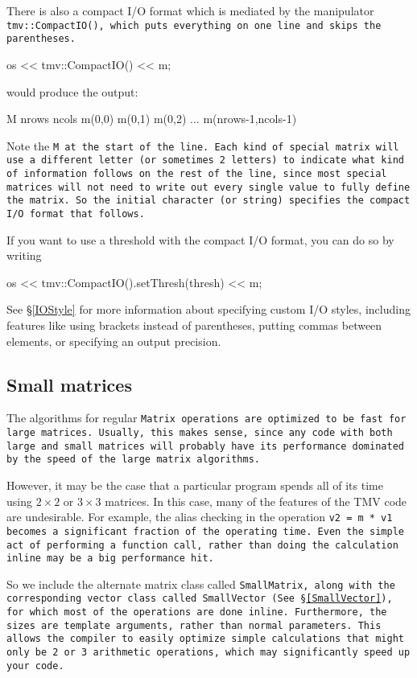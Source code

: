 There is also a compact I/O format which is mediated by the manipulator
\tt{tmv::CompactIO()}, which puts everything on one line and skips the parentheses.
\begin{tmvcode}
os << tmv::CompactIO() << m;
\end{tmvcode}
would produce the output:
\begin{tmvcode}
M nrows ncols m(0,0) m(0,1) m(0,2) ... m(nrows-1,ncols-1)
\end{tmvcode}
Note the \tt{M} at the start of the line.  Each kind of special matrix will use a different letter (or sometimes 2 letters) to indicate what kind of information follows on the rest of the line, since most special matrices will not need to write out every single value to fully define the matrix.  So the initial character (or string) specifies the compact I/O format that follows.

If you want to use a threshold with the compact I/O format, you can do so by writing
\begin{tmvcode}
os << tmv::CompactIO().setThresh(thresh) << m;
\end{tmvcode}
See \S\ref{IOStyle} for more information about specifying custom I/O styles, including
features like using brackets instead of parentheses, putting commas between elements,
or specifying an output precision.  

\subsection{Small matrices}
\label{SmallMatrix}

The algorithms for regular \tt{Matrix} operations are optimized to be
fast for large matrices.  Usually, this makes sense, since any code with
both large and small matrices will probably have its performance dominated
by the speed of the large matrix algorithms.

However, it may be the case that a particular program spends all of its
time using $2 \times 2$ or $3 \times 3$ matrices.  In this case, 
many of the features of the TMV code are undesirable.  For example, 
the alias checking in the operation \tt{v2 = m * v1} becomes a significant
fraction of the operating time.  Even the simple act of performing a function
call, rather than doing the calculation inline may be a big performance hit.

So we include the alternate matrix class called \tt{SmallMatrix}, along 
with the corresponding vector class called \tt{SmallVector} (See \S\ref{SmallVector}), 
for which most of 
the operations are done inline.  Furthermore, the sizes are template arguments,
rather than normal parameters.  This allows the compiler to easily optimize
simple calculations that might only be 2 or 3 arithmetic operations, which
may significantly speed up your code.

